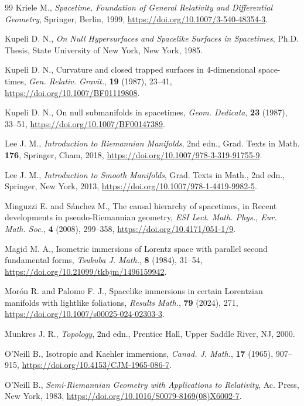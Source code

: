 \documentclass[11pt]{article}
\numberwithin{equation}{section}
\begin{document}
\begin{thebibliography}{99}
		Kriele M., {\it Spacetime, Foundation of General Relativity and Differential Geometry}, Springer, Berlin, 1999, \url{https://doi.org/10.1007/3-540-48354-3}.
		
		Kupeli D. N.,  \emph{On Null Hypersurfaces and Spacelike Surfaces in Spacetimes},
		Ph.D. Thesis, State University of New York, New York, 1985.
		
		Kupeli D. N., Curvature and closed trapped surfaces in 4-dimensional space-times, \emph{Gen. Relativ. Gravit.}, \textbf{19} (1987), 23--41, \url{https://doi.org/10.1007/BF01119808}.
		
		Kupeli D. N., On null submanifolds in spacetimes, \emph{Geom. Dedicata}, \textbf{23} (1987), 33--51, \url{https://doi.org/10.1007/BF00147389}.
		
		Lee J. M., \emph{Introduction to Riemannian Manifolds},
		2nd edn., Grad. Texts in Math. \textbf{176}, Springer, Cham, 2018,
		\url{https://doi.org/10.1007/978-3-319-91755-9}.

		Lee J. M., \emph{ Introduction to Smooth Manifolds},  Grad. Texts in Math., 2nd edn.,  Springer, New York, 2013, \url{https://doi.org/10.1007/978-1-4419-9982-5}.
		
		Minguzzi E. and Sánchez M., The causal hierarchy of spacetimes, in Recent developments in pseudo-Riemannian geometry, \emph{ESI Lect. Math. Phys., Eur. Math. Soc.}, \textbf{4} (2008),  299--358, \url{https://doi.org/10.4171/051-1/9}.
		
		Magid M. A., Isometric immersions of Lorentz space with parallel second fundamental forms, \emph{Tsukuba J. Math.}, \textbf{8} (1984), 31--54, \url{https://doi.org/10.21099/tkbjm/1496159942}.
		
		Morón R. and Palomo F. J.,
		Spacelike immersions in certain Lorentzian manifolds with lightlike foliations,
		\emph{Results Math.}, \textbf{79} (2024), 271, \url{https://doi.org/10.1007/s00025-024-02303-3}.
		
		
		Munkres J. R., \emph{Topology}, 2nd edn.,
		Prentice Hall, Upper Saddle River, NJ, 2000.

		O'Neill B., Isotropic and Kaehler immersions,
		\emph{Canad. J. Math.}, \textbf{17} (1965), 907--915, \url{https://doi.org/10.4153/CJM-1965-086-7}.
		
		O'Neill B., \emph{Semi-Riemannian Geometry with Applications to Relativity},  Ac. Press, New York, 1983, \url{https://doi.org/10.1016/S0079-8169(08)X6002-7}.
		

\end{thebibliography}
\end{document}
